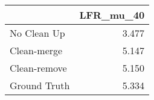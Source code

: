 \begin{tabular}{lr}
\toprule
{} & LFR_mu_40 \\
\midrule
No Clean Up  &     3.477 \\
Clean-merge  &     5.147 \\
Clean-remove &     5.150 \\
Ground Truth &     5.334 \\
\bottomrule
\end{tabular}
